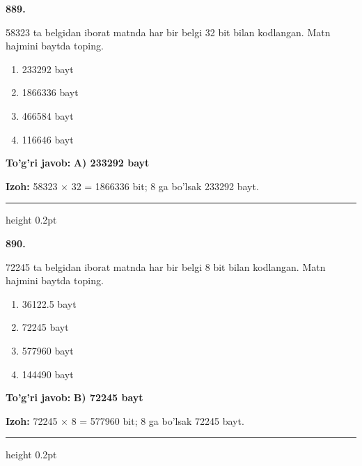 \documentclass[10pt,a4paper,oneside]{article}
\begin{document}
\noindent\textbf{\color{ink}889.}
\par
58323 ta belgidan iborat matnda har bir belgi 32 bit bilan kodlangan. Matn hajmini baytda toping.
\begin{enumerate}[label=\Alph*),leftmargin=9mm]
\item 233292 bayt
\item 1866336 bayt
\item 466584 bayt
\item 116646 bayt
\end{enumerate}
\begin{tcolorbox}[enhanced,breakable,colback=teal!4,colframe=teal!50!black,boxrule=0.5pt,arc=1.1mm,left=3mm,right=3mm,top=1.7mm,bottom=1.7mm,before skip=2mm,after skip=2mm]
\textbf{\color{teal}To'g'ri javob:} \textbf{A) 233292 bayt}
\par\smallskip
\textbf{Izoh:} 58323 \ensuremath{\times} 32 = 1866336 bit; 8 ga bo'lsak 233292 bayt.
\end{tcolorbox}
\vspace{2mm}\hrule height 0.2pt \vspace{3mm}

\noindent\textbf{\color{ink}890.}
\par
72245 ta belgidan iborat matnda har bir belgi 8 bit bilan kodlangan. Matn hajmini baytda toping.
\begin{enumerate}[label=\Alph*),leftmargin=9mm]
\item 36122.5 bayt
\item 72245 bayt
\item 577960 bayt
\item 144490 bayt
\end{enumerate}
\begin{tcolorbox}[enhanced,breakable,colback=teal!4,colframe=teal!50!black,boxrule=0.5pt,arc=1.1mm,left=3mm,right=3mm,top=1.7mm,bottom=1.7mm,before skip=2mm,after skip=2mm]
\textbf{\color{teal}To'g'ri javob:} \textbf{B) 72245 bayt}
\par\smallskip
\textbf{Izoh:} 72245 \ensuremath{\times} 8 = 577960 bit; 8 ga bo'lsak 72245 bayt.
\end{tcolorbox}
\vspace{2mm}\hrule height 0.2pt \vspace{3mm}
\end{document}
